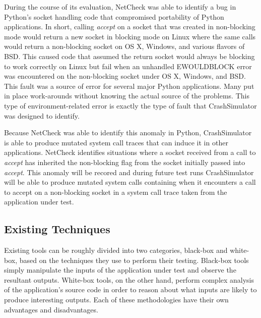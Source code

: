     During the course of its evaluation, NetCheck was able to identify a bug in Python's socket handling code that
    compromised portability of Python applications. In short, calling \emph{accept} on a socket that was created in
    non-blocking mode would return a new socket in blocking mode on Linux where the same calls would return a
    non-blocking socket on OS X, Windows, and various flavors of BSD\@. This caused code that assumed the return
    socket would always be blocking to work correctly on Linux but fail when an unhandled EWOULDBLOCK error was
    encountered on the non-blocking socket under OS X, Windows, and BSD\@. This fault was a source of error for
    several major Python applications. Many put in place work-arounds without knowing the actual source of the
    problems.  This type of environment-related error is exactly the type of fault that CrashSimulator was designed
    to identify.

    Because NetCheck was able to identify this anomaly in Python, CrashSimulator is able to produce mutated system
    call traces that can induce it in other applications. NetCheck identifies situations where a socket received
    from a call to \emph{accept} has inherited the non-blocking flag from the socket initially passed into
    \emph{accept}. This anomaly will be recored and during future test runs CrashSimulator will be able to produce
    mutated system calls containing when it encounters a call to accept on a non-blocking socket in a system call
    trace taken from the application under test.

    \subsection{Existing Techniques}

    Existing tools can be roughly divided into two categories, black-box and white-box, based on the techniques they
    use to perform their testing. Black-box tools simply manipulate the inputs of the application under test and
    observe the resultant outputs. White-box tools, on the other hand, perform complex analysis of the application's
    source code in order to reason about what inputs are likely to produce interesting outputs. Each of these
    methodologies have their own advantages and disadvantages.

